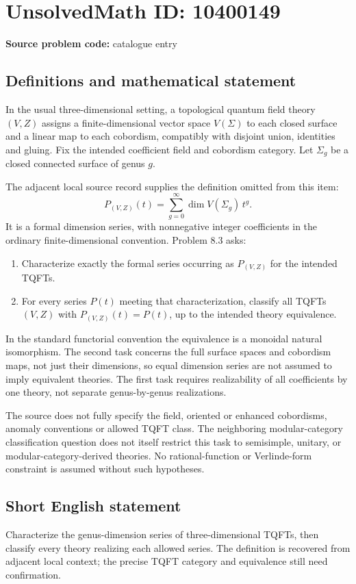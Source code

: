 \documentclass[11pt]{article}
\begin{document}
\section*{UnsolvedMath ID: 10400149}
\textbf{Source problem code:} catalogue entry
\subsection{Definitions and mathematical statement}
In the usual three-dimensional setting, a topological quantum field theory \((V,Z)\) assigns a finite-dimensional vector space \(V(\Sigma)\) to each closed surface and a linear map to each cobordism, compatibly with disjoint union, identities and gluing. Fix the intended coefficient field and cobordism category. Let \(\Sigma_g\) be a closed connected surface of genus \(g\).

The adjacent local source record supplies the definition omitted from this item:
\[
 P_{(V,Z)}(t)=\sum_{g=0}^{\infty}\dim V(\Sigma_g)\,t^g.
\]
It is a formal dimension series, with nonnegative integer coefficients in the ordinary finite-dimensional convention. Problem 8.3 asks:
\begin{enumerate}
\item Characterize exactly the formal series occurring as \(P_{(V,Z)}\) for the intended TQFTs.
\item For every series \(P(t)\) meeting that characterization, classify all TQFTs \((V,Z)\) with \(P_{(V,Z)}(t)=P(t)\), up to the intended theory equivalence.
\end{enumerate}
In the standard functorial convention the equivalence is a monoidal natural isomorphism. The second task concerns the full surface spaces and cobordism maps, not just their dimensions, so equal dimension series are not assumed to imply equivalent theories. The first task requires realizability of all coefficients by one theory, not separate genus-by-genus realizations.

The source does not fully specify the field, oriented or enhanced cobordisms, anomaly conventions or allowed TQFT class. The neighboring modular-category classification question does not itself restrict this task to semisimple, unitary, or modular-category-derived theories. No rational-function or Verlinde-form constraint is assumed without such hypotheses.
\subsection{Short English statement}
Characterize the genus-dimension series of three-dimensional TQFTs, then classify every theory realizing each allowed series. The definition is recovered from adjacent local context; the precise TQFT category and equivalence still need confirmation.
\end{document}

